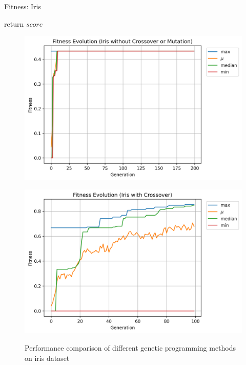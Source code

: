 \documentclass[12pt, final]{dalcsthesis}
\begin{document}
\begin{algorithm}[hb]
	\caption{Fitness: Iris}
	\label{alg:fitness-iris}
	\begin{algorithmic}[1]
		\EndIf
		\EndFor
		\State return $score$
	\end{algorithmic}
\end{algorithm}

\begin{figure}[hb]
	\centering
	\begin{subfloat}{\includegraphics[width=\textwidth]{iris_baseline.png}\label{fig:iris_baseline}}
	\end{subfloat}

	\begin{subfloat}{\includegraphics[width=\textwidth]{iris_crossover.png}\label{fig:iris_crossover}}
	\end{subfloat}

	\caption{Performance comparison of different genetic programming methods on iris dataset}
	\label{fig:iris_comparison}
\end{figure}
\end{document}
